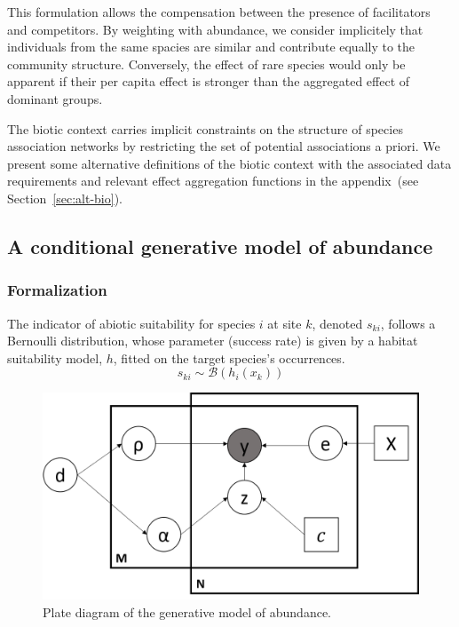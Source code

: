 \documentclass[]{article}
\newcommand{\commG}[1]{#1}
\newcommand{\spc}{i}
\newcommand{\site}{k}
\newcommand{\abiov}{x}
\newcommand{\ssuit}{s}
\newcommand{\habs}{h}
\begin{document}
This formulation allows the compensation between the presence of facilitators and competitors. By weighting with abundance, we consider implicitely that individuals from the same spacies are similar and contribute equally to the community structure. Conversely, the effect of rare species would only be apparent if their per capita effect is stronger than the aggregated effect of dominant groups.

The biotic context carries implicit constraints on the structure of species association networks by restricting the set of potential associations a priori. We present some alternative definitions of the biotic context with the associated data requirements and relevant effect aggregation functions in the appendix~(see Section~\ref{sec:alt-bio}). 


\subsection{A conditional generative model of abundance}

\subsubsection{Formalization}
The indicator of abiotic suitability for species $\spc$ at site $\site$, denoted $\ssuit_{\site\spc}$, follows a Bernoulli distribution, whose parameter (success rate) is given by a habitat suitability model, $\habs$, fitted on the target species's occurrences.
\begin{equation*}
    \ssuit_{\site\spc} \sim \mathcal{B}(\habs_{\spc}(\abiov_{\site}))
\end{equation*}

\begin{figure}[h]
	\centering
	\commG{\includegraphics[scale=0.5]{plate}}
	\caption{Plate diagram of the generative model of abundance.}
	\label{plate}
\end{figure}
\end{document}
